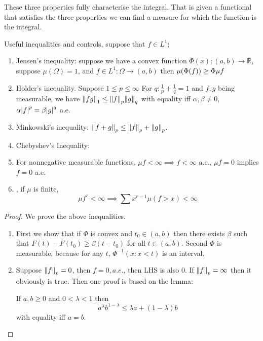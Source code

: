 \begin{remark}
    These three properties fully characterise the integral. That is given a functional that satisfies the three properties we can find a measure for which the function is the integral. 
\end{remark}

\begin{thm}
    Useful inequalities and controls, suppose that \(f \in L^{1}\);
    \begin{enumerate}
        \item Jensen's inequality: suppose we have a convex function \(\Phi(x): (a,b) \to \mathbb{R}\), suppose \(\mu(\Omega)=1\), and \(f \in L^{1}: \Omega \to (a,b) \) then \(\mu\pqty{\Phi(f)} \geq \Phi \mu f\)
        \item Holder's inequality. Suppose \(1 \leq p \leq \infty\) For \(q: \frac{1}{p} + \frac{1}{q} = 1\) and \(f,g\) being measurable, we have \(\norm{fg}_{1} \leq \norm{f}_{p} \norm{g}_{q}\) with equality iff \(\alpha, \beta \neq 0\), \(\alpha \abs{f}^{p} = \beta \abs{g}^{q}\) a.e. 
        \item Minkowski's inequality: \(\norm{f + g}_{p} \leq \norm{f}_{p} + \norm{g}_{p}\).
        \item Chebyshev's Inequality: 
        \item For nonnegative measurable functions, \(\mu f < \infty  \implies f < \infty\) a.e., \(\mu f = 0\) implies \(f = 0\) a.e. 
        \item {}, if \(\mu\) is finite, 
        \begin{equation*}
            \mu f^{r} < \infty \implies \sum x^{r - 1} \mu(f> x) < \infty
        \end{equation*}
    \end{enumerate}    
\end{thm}

\begin{proof}
    We prove the above inequalities. 
    \begin{enumerate}
        \item First we show that if \(\Phi\) is convex and \(t_{0}\in (a,b)\) then there exists \(\beta\) such that \(F(t) - F(t_{0}) \geq \beta(t-t_{0})\) for all \( t \in (a,b)\).  Second \(\Phi\) is measurable, because for any \(t\), \(\Phi^{-1} ({x: x < t})\) is an interval. 
            
        \item Suppose \(\norm{f}_{p} = 0\), then \(f = 0, a.e.\), then LHS is also \(0\). If \(\norm{f}_{p} = \infty\) then it obviously is true. Then one proof is based on the lemma:
        \begin{lemma}
            If \(a,b \geq 0\) and \(0 < \lambda <1\) then 
            \begin{equation*}
                a^{\lambda} b^{1-\lambda} \leq \lambda a +(1-\lambda) b
            \end{equation*}
            with equality iff \(a = b\). 
        \end{lemma}
    \end{enumerate}
\end{proof}


